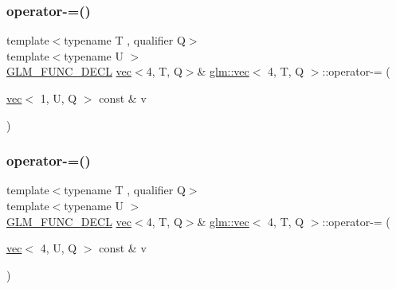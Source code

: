 \subsubsection{\texorpdfstring{operator-\/=()}{operator-=()}\hspace{0.1cm}{\footnotesize\ttfamily [2/6]}}
{\footnotesize\ttfamily template$<$typename T , qualifier Q$>$ \\
template$<$typename U $>$ \\
\mbox{\hyperlink{setup_8hpp_ab2d052de21a70539923e9bcbf6e83a51}{G\+L\+M\+\_\+\+F\+U\+N\+C\+\_\+\+D\+E\+CL}} \mbox{\hyperlink{structglm_1_1vec}{vec}}$<$4, T, Q$>$\& \mbox{\hyperlink{structglm_1_1vec}{glm\+::vec}}$<$ 4, T, Q $>$\+::operator-\/= (\begin{DoxyParamCaption}\item[{\mbox{\hyperlink{structglm_1_1vec}{vec}}$<$ 1, U, Q $>$ const \&}]{v }\end{DoxyParamCaption})}

\mbox{\label{structglm_1_1vec_3_014_00_01_t_00_01_q_01_4_a6c7121aa85c158912c509760cf65da75}} 
\subsubsection{\texorpdfstring{operator-\/=()}{operator-=()}\hspace{0.1cm}{\footnotesize\ttfamily [3/6]}}
{\footnotesize\ttfamily template$<$typename T , qualifier Q$>$ \\
template$<$typename U $>$ \\
\mbox{\hyperlink{setup_8hpp_ab2d052de21a70539923e9bcbf6e83a51}{G\+L\+M\+\_\+\+F\+U\+N\+C\+\_\+\+D\+E\+CL}} \mbox{\hyperlink{structglm_1_1vec}{vec}}$<$4, T, Q$>$\& \mbox{\hyperlink{structglm_1_1vec}{glm\+::vec}}$<$ 4, T, Q $>$\+::operator-\/= (\begin{DoxyParamCaption}\item[{\mbox{\hyperlink{structglm_1_1vec}{vec}}$<$ 4, U, Q $>$ const \&}]{v }\end{DoxyParamCaption})}

\mbox{\label{structglm_1_1vec_3_014_00_01_t_00_01_q_01_4_aea3f23ac07ef99b7189102d95bf26a85}} 
